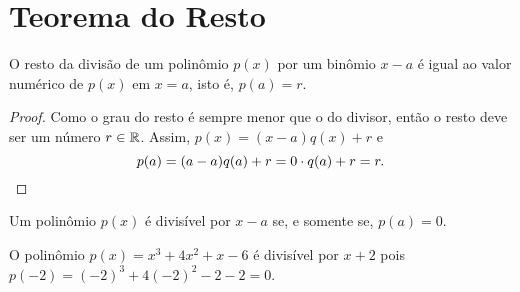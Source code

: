 \section{Teorema do Resto}

\begin{teo}
    O resto da divisão de um polinômio $p(x)$ por um binômio $x-a$ é igual ao valor numérico de $p(x)$ em $x=a$, isto é, $p(a)=r$.
\end{teo}
\begin{proof}
    Como o grau do resto é sempre menor que o do divisor, então o resto deve ser um número $r\in\mathbb{R}$. Assim, $p(x)=(x-a)q(x)+r$ e
    \begin{equation*}
        p(a)=(a-a)q(a)+r=0\cdot q(a)+r=r.\qedhere
    \end{equation*}
\end{proof}

\begin{teo}
    Um polinômio $p(x)$ é divisível por $x-a$ se, e somente se, $p(a)=0$.
\end{teo}

\begin{exem}
    O polinômio $p(x)=x^3+4x^2+x-6$ é divisível por $x+2$ pois $p(-2)=(-2)^3+4(-2)^2-2-2=0$.
\end{exem}







